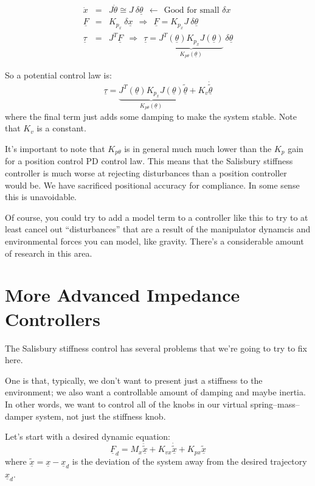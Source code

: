 \documentclass[]{article}
\begin{document}
\begin{eqnarray}
 \dot{x} & = & J\dot{\theta} \cong J\ \delta\underline{\theta}\ \  \leftarrow\ \  \text{Good for small $\delta x$} \nonumber \\
 \underline{F} & = & K_{p_{x}}\ \delta\underline{x}\ \  \Rightarrow\ \  \underline{F} = K_{p_{x}}J\ \delta\underline{\theta} \nonumber \\
 \underline{\tau} & = & J^{T}\underline{F}\ \ \Rightarrow\ \ \underline{\tau} = \underbrace{J^{T}(\underline{\theta})K_{p_{x}}J(\underline{\theta})}_{K_{p\theta} (\underline{\theta})}\ \delta\underline{\theta} \nonumber
\end{eqnarray}

So a potential control law is:
\begin{displaymath}
 \underline{\tau} = \underbrace{J^{T}(\underline{\theta})K_{p_{x}}J(\underline{\theta})}_{K_{p\theta} (\underline{\theta})}\underline{\tilde{\theta}} + K_{v}\dot{\tilde{\underline{\theta}}}
\end{displaymath}
where the final term just adds some damping to make the system stable. Note that $K_{v}$ is a constant.

It's important to note that $K_{p\theta}$ is in general much much lower than the $K_{p}$ gain for a position control PD control law. This means that the Salisbury stiffness controller is much worse at rejecting disturbances than a position controller would be. We have sacrificed positional accuracy for compliance. In some sense this is unavoidable.

Of course, you could try to add a model term to a controller like this to try to at least cancel out ``disturbances'' that are a result of the manipulator dynamcis and environmental forces you can model, like gravity. There's a considerable amount of research in this area.

\section{More Advanced Impedance Controllers}
The Salisbury stiffness control has several problems that we're going to try to fix here.

One is that, typically, we don't want to present just a stiffness to the environment; we also want a controllable amount of damping and maybe inertia. In other words, we want to control all of the knobs in our virtual spring--mass--damper system, not just the stiffness knob.

Let's start with a desired dynamic equation:
\begin{equation}
 \underline{F}_{d} = M_{x} \ddot{\tilde{\underline{x}}} + K_{vx}\dot{\tilde{\underline{x}}} + K_{px}\tilde{\underline{x}}
\end{equation}
where $\tilde{\underline{x}} = \underline{x} - \underline{x}_{d}$ is the deviation of the system away from the desired trajectory $\underline{x}_{d}$.
\end{document}
